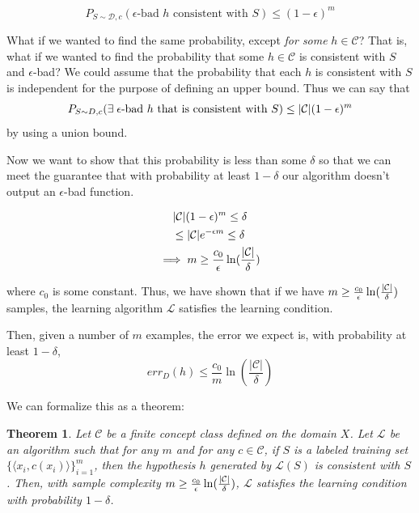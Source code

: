 \documentclass{article}
\newtheorem{thm}{Theorem}
\DeclarePairedDelimiter\abs{\lvert}{\rvert}
\begin{document}
$$P_{S \sim \mathcal{D}, c}(\text{$\epsilon$-bad $h$ consistent with $S$}) \leq
        (1-\epsilon)^m$$

What if we wanted to find the same probability, except \textit{for some}
$h \in \mathcal{C}$? That is, what if we wanted to find the probability
that some $h \in \mathcal{C}$ is consistent with $S$ and $\epsilon$-bad?
We could assume that the probability that each $h$ is consistent with
$S$ is independent for the purpose of defining an upper bound. Thus we
can say that
\[ P_{S \sim D, c} (\text{$\exists\;\epsilon$-bad $h$ that is consistent
with $S$}) \leq \abs{\mathcal{C}}(1-\epsilon)^m \] by using a union bound.

Now we want to show that this probability is less than some $\delta$ so
that we can meet the guarantee that with probability at least $1-\delta$
our algorithm doesn't output an $\epsilon$-bad function.

\begin{gather*}
    |\mathcal{C}|(1-\epsilon)^m \leq \delta\\
        \leq |\mathcal{C}|e^{-\epsilon m} \leq \delta\\
        \implies  m \geq \frac{c_0}{\epsilon}\ln(\frac{\abs{\mathcal{C}}}{\delta})
\end{gather*}

where $c_0$ is some constant. Thus, we have shown that if we have
$m \geq \frac{c_0}{\epsilon} \ln(\frac{\abs{\mathcal{C}}}{\delta})$
samples, the learning algorithm $\mathcal{L}$ satisfies the learning
condition.

Then, given a number of $m$ examples, the error we expect is, with
probability at least $1-\delta$,
$$err_D(h) \leq \frac{c_0}{m}\ln(\frac{|\mathcal{C}|}{\delta})$$

We can formalize this as a theorem:

\begin{framed}
\begin{thm}
    Let $\mathcal{C}$ be a finite concept class defined on the domain
    $X$. Let $\mathcal{L}$ be an algorithm such that for any $m$ and for
    any $c \in \mathcal{C}$, if $S$ is a labeled training set
    $\{\langle x_i, c(x_i) \rangle\}_{i=1}^m$, then the hypothesis $h$
    generated by $\mathcal{L}(S)$ is consistent with $S$. Then, with
    sample complexity
    $m \geq \frac{c_0}{\epsilon}\ln(\frac{\abs{\mathcal{C}}}{\delta})$,
    $\mathcal{L}$ satisfies the learning condition with
    probability $1-\delta$.
\end{thm}
\end{framed}
\end{document}

